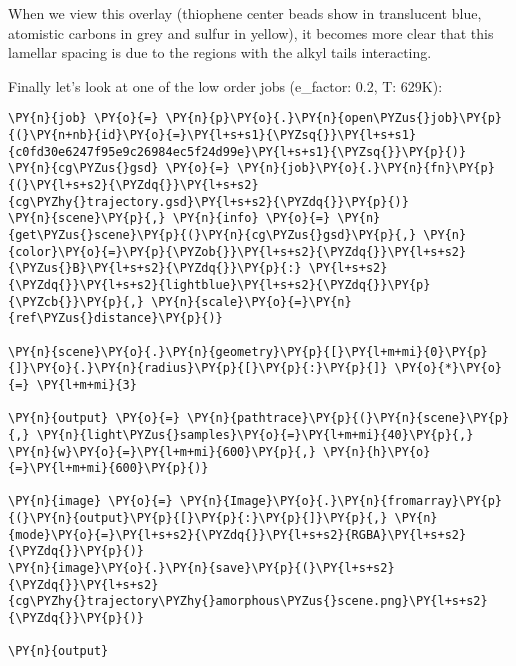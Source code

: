             
    
    \begin{center}
    \end{center}
    

    When we view this overlay (thiophene center beads show in translucent
blue, atomistic carbons in grey and sulfur in yellow), it becomes more
clear that this lamellar spacing is due to the regions with the alkyl
tails interacting.

Finally let's look at one of the low order jobs (e\_factor: 0.2, T:
629K):

    \begin{tcolorbox}[breakable, size=fbox, boxrule=1pt, pad at break*=1mm,colback=cellbackground, colframe=cellborder]
\begin{Verbatim}[commandchars=\\\{\}]
\PY{n}{job} \PY{o}{=} \PY{n}{p}\PY{o}{.}\PY{n}{open\PYZus{}job}\PY{p}{(}\PY{n+nb}{id}\PY{o}{=}\PY{l+s+s1}{\PYZsq{}}\PY{l+s+s1}{c0fd30e6247f95e9c26984ec5f24d99e}\PY{l+s+s1}{\PYZsq{}}\PY{p}{)}
\PY{n}{cg\PYZus{}gsd} \PY{o}{=} \PY{n}{job}\PY{o}{.}\PY{n}{fn}\PY{p}{(}\PY{l+s+s2}{\PYZdq{}}\PY{l+s+s2}{cg\PYZhy{}trajectory.gsd}\PY{l+s+s2}{\PYZdq{}}\PY{p}{)}
\PY{n}{scene}\PY{p}{,} \PY{n}{info} \PY{o}{=} \PY{n}{get\PYZus{}scene}\PY{p}{(}\PY{n}{cg\PYZus{}gsd}\PY{p}{,} \PY{n}{color}\PY{o}{=}\PY{p}{\PYZob{}}\PY{l+s+s2}{\PYZdq{}}\PY{l+s+s2}{\PYZus{}B}\PY{l+s+s2}{\PYZdq{}}\PY{p}{:} \PY{l+s+s2}{\PYZdq{}}\PY{l+s+s2}{lightblue}\PY{l+s+s2}{\PYZdq{}}\PY{p}{\PYZcb{}}\PY{p}{,} \PY{n}{scale}\PY{o}{=}\PY{n}{ref\PYZus{}distance}\PY{p}{)}

\PY{n}{scene}\PY{o}{.}\PY{n}{geometry}\PY{p}{[}\PY{l+m+mi}{0}\PY{p}{]}\PY{o}{.}\PY{n}{radius}\PY{p}{[}\PY{p}{:}\PY{p}{]} \PY{o}{*}\PY{o}{=} \PY{l+m+mi}{3}

\PY{n}{output} \PY{o}{=} \PY{n}{pathtrace}\PY{p}{(}\PY{n}{scene}\PY{p}{,} \PY{n}{light\PYZus{}samples}\PY{o}{=}\PY{l+m+mi}{40}\PY{p}{,} \PY{n}{w}\PY{o}{=}\PY{l+m+mi}{600}\PY{p}{,} \PY{n}{h}\PY{o}{=}\PY{l+m+mi}{600}\PY{p}{)}

\PY{n}{image} \PY{o}{=} \PY{n}{Image}\PY{o}{.}\PY{n}{fromarray}\PY{p}{(}\PY{n}{output}\PY{p}{[}\PY{p}{:}\PY{p}{]}\PY{p}{,} \PY{n}{mode}\PY{o}{=}\PY{l+s+s2}{\PYZdq{}}\PY{l+s+s2}{RGBA}\PY{l+s+s2}{\PYZdq{}}\PY{p}{)}
\PY{n}{image}\PY{o}{.}\PY{n}{save}\PY{p}{(}\PY{l+s+s2}{\PYZdq{}}\PY{l+s+s2}{cg\PYZhy{}trajectory\PYZhy{}amorphous\PYZus{}scene.png}\PY{l+s+s2}{\PYZdq{}}\PY{p}{)}

\PY{n}{output}
\end{Verbatim}
\end{tcolorbox}
 
